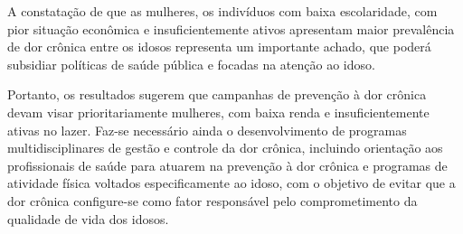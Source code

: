 \documentclass{article}
\begin{document}
A constatação de que as mulheres, os indivíduos com baixa escolaridade, com pior
situação econômica e insuficientemente ativos apresentam maior prevalência de
dor crônica entre os idosos representa um importante achado, que poderá
subsidiar políticas de saúde pública e focadas na atenção ao idoso.

Portanto, os resultados sugerem que campanhas de prevenção à dor crônica devam
visar prioritariamente mulheres, com baixa renda e insuficientemente ativas no
lazer. Faz-se necessário ainda o desenvolvimento de programas multidisciplinares
de gestão e controle da dor crônica, incluindo orientação aos profissionais de
saúde para atuarem na prevenção à dor crônica e programas de atividade física
voltados especificamente ao idoso, com o objetivo de evitar que a dor crônica
configure-se como fator responsável pelo comprometimento da qualidade de vida
dos idosos.
\end{document}

